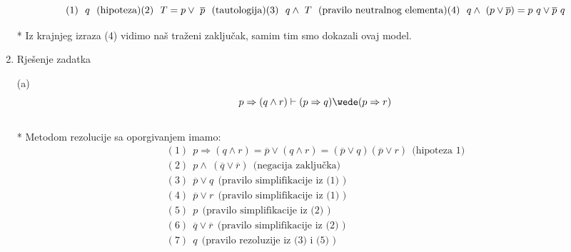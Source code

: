 \documentclass[12pt]{article}
\begin{document}
\begin{enumerate}
\begin{equation*}
	        (1)~~ q ~~\text{(hipoteza)} \\
	        
	        (2)~~ T = p \vee~\overline{p} ~~ \text{(tautologija)} \\
	        
	        (3)~~ q \wedge~T ~~ \text{(pravilo neutralnog elementa)} \\
	        
	        (4)~~ q \wedge~(p \vee \overline{p}) = p~q \vee \overline{p}~q \\
	        
	    \end{equation*}
	    
	    * Iz krajnjeg izraza (4) vidimo naš traženi zaključak, samim tim smo dokazali ovaj model.
	    

	    
	    \newpage
		\item Rješenje zadatka
		
		(a) \begin{equation*}
		    p \Rightarrow (q \wedge r) \vdash (p \Rightarrow q) \wede (p \Rightarrow r)
		\end{equation*}
        \\
		* Metodom rezolucije sa oporgivanjem imamo: 
		\begin{align*}     
		
		    (1)~~ p \Rightarrow ( q \wedge r) = \overline{p} \vee (q \wedge r) = (\overline{p} \vee q)(\overline{p} \vee r)  ~~ \text{(hipoteza~1)} \\
		    
		    (2)~~ p \wedge~(\overline{q} \vee \overline{r}) ~~ \text{(negacija zaključka)} \\
		    
		    (3)~~ \overline{p} \vee q ~~ \text{(pravilo~simplifikacije~iz~(1)~)} \\
		    
		    (4)~~ \overline{p} \vee r ~~ \text{(pravilo~simplifikacije~iz~(1)~)} \\
		    
		    (5)~~ p ~~ \text{(pravilo~simplifikacije~iz~(2)~)} \\
		    
		    (6)~~ \overline{q} \vee \overline{r} ~~ \text{(pravilo~simplifikacije~iz~(2)~)} \\
		    
		    (7)~~ q ~~ \text{(pravilo~rezoluzije~iz~(3)~i~(5)~)} \\
		    

\end{align*}
\end{enumerate}
\end{document}
